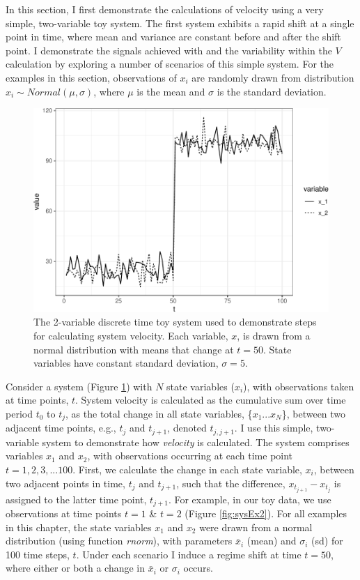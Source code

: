 \documentclass[12pt,twoside,openany]{reedthesis}
\begin{document}
In this section, I first demonstrate the calculations of velocity using a very simple, two-variable toy system. The first system exhibits a rapid shift at a single point in time, where mean and variance are constant before and after the shift point. I demonstrate the signals achieved with and the variability within the \(V\) calculation by exploring a number of scenarios of this simple system. For the examples in this section, observations of \(x_i\) are randomly drawn from distribution \(x_i\sim Normal(\mu, \sigma)\), where \(\mu\) is the mean and \(\sigma\) is the standard deviation.
\begin{figure}
\includegraphics[width=0.85\linewidth]{_myDissertation_files/figure-latex/sysEx-1} \caption{The 2-variable discrete time toy system used to demonstrate steps for calculating system velocity. Each variable, $x$, is drawn from a normal distribution with means that change at $t = 50$. State variables have constant standard deviation, $\sigma = 5$.}\label{fig:sysEx}
\end{figure}
Consider a system (Figure \ref{fig:sysEx}) with \(N\) state variables (\(x_i\)), with observations taken at time points, \(t\). System velocity is calculated as the cumulative sum over time period \(t_0\) to \(t_j\), as the total change in all state variables, \{\(x_1 ...x_N\)\}, between two adjacent time points, e.g., \(t_j\) and \(t_{j+1}\), denoted \(t_{j,j+1}\). I use this simple, two-variable system to demonstrate how \emph{velocity} is calculated. The system comprises variables \(x_1\) and \(x_2\), with observations occurring at each time point \(t = {1,2,3,...100}\). First, we calculate the change in each state variable, \(x_i\), between two adjacent points in time, \(t_j\) and \(t_{j+1}\), such that the difference, \(x_{t_{j+1}} - x_{t_j}\) is assigned to the latter time point, \(t_{j+1}\). For example, in our toy data, we use observations at time points \(t = 1\) \& \(t=2\) (Figure \ref{fig:sysEx2}). For all examples in this chapter, the state variables \(x_1\) and \(x_2\) were drawn from a normal distribution (using function \emph{rnorm}), with parameters \(\bar{x}_i\) (mean) and \(\sigma_i\) (sd) for 100 time steps, \(t\). Under each scenario I induce a regime shift at time \(t=50\), where either or both a change in \(\bar{x}_i\) or \(\sigma_i\) occurs.
\end{document}
